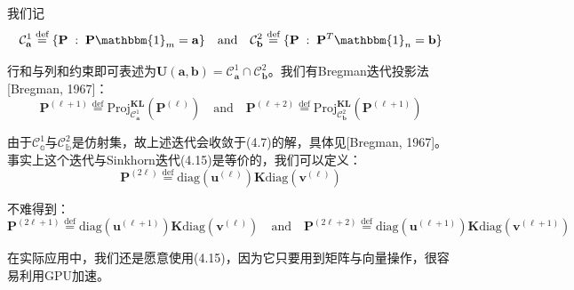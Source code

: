 \documentclass[cn,10pt,math=newtx,citestyle=gb7714-2015,bibstyle=gb7714-2015]{elegantbook}
\begin{document}
\begin{postulate}[Bregman迭代投影法]
我们记
\begin{equation*}
    \mathcal{C}_\mathbf{a}^1 \overset{\text{def}}{=} \{ \mathbf{P}\; : \; \mathbf{P}\mathbbm{1}_m=\mathbf{a} \} \quad \text{and} \quad \mathcal{C}_\mathbf{b}^2 \overset{\text{def}}{=} \{ \mathbf{P}\; : \; \mathbf{P}^T\mathbbm{1}_n=\mathbf{b} \}
\end{equation*}

行和与列和约束即可表述为$\mathbf{U(a,b)} = \mathcal{C}_\mathbf{a}^1 \cap \mathcal{C}_\mathbf{b}^2$。我们有Bregman迭代投影法[Bregman, 1967]：
\begin{equation}
    \label{4.16}
    \mathbf{P}^{(\ell + 1)} \overset{\text{def}}{=} \text{Proj}_{\mathcal{C}_\mathbf{a}^1}^{\mathbf{KL}} (\mathbf{P}^{(\ell)}) \quad \text{and} \quad \mathbf{P}^{(\ell + 2)} \overset{\text{def}}{=} \text{Proj}_{\mathcal{C}_\mathbf{b}^2}^{\mathbf{KL}} (\mathbf{P}^{(\ell + 1)})
\end{equation}

由于$\mathcal{C}_\mathbb{a}^1$与$\mathcal{C}_\mathbb{b}^2$是仿射集，故上述迭代会收敛于(4.7)的解，具体见[Bregman, 1967]。事实上这个迭代与Sinkhorn迭代(4.15)是等价的，我们可以定义：
\begin{equation*}
    \mathbf{P}^{(2\ell)} \overset{\text{def}}{=} \text{diag}(\mathbf{u}^{(\ell)}) \mathbf{K} \text{diag}(\mathbf{v}^{(\ell)})
\end{equation*}

不难得到：
\begin{equation*}
    \mathbf{P}^{(2\ell+1)} \overset{\text{def}}{=} \text{diag}(\mathbf{u}^{(\ell+1)}) \mathbf{K} \text{diag}(\mathbf{v}^{(\ell)}) \quad \text{and} \quad  \mathbf{P}^{(2\ell+2)} \overset{\text{def}}{=} \text{diag}(\mathbf{u}^{(\ell+1)}) \mathbf{K} \text{diag}(\mathbf{v}^{(\ell+1)})
\end{equation*}

在实际应用中，我们还是愿意使用(4.15)，因为它只要用到矩阵与向量操作，很容易利用GPU加速。
\end{postulate}
\end{document}
